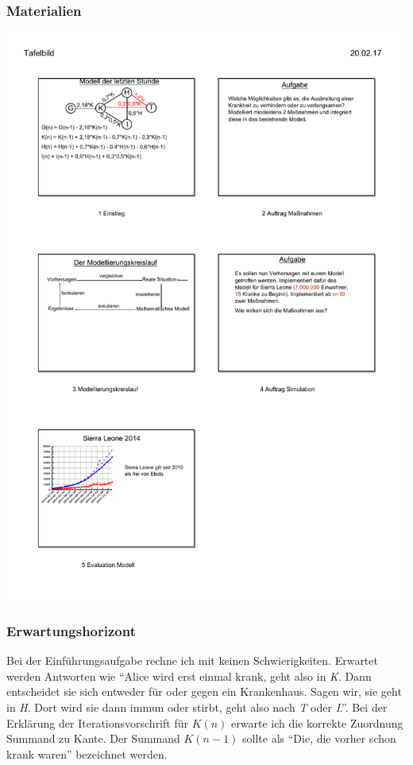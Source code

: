 \subsubsection*{Materialien}
\includegraphics[width=\textwidth]{projekt/Tafelbild_3_c}
\subsubsection*{Erwartungshorizont}
Bei der Einführungsaufgabe rechne ich mit keinen Schwierigkeiten. Erwartet werden Antworten wie ``Alice wird erst einmal krank, geht also in \emph{K}. Dann entscheidet sie sich entweder für oder gegen ein Krankenhaus. Sagen wir, sie geht in \emph{H}. Dort wird sie dann immun oder stirbt, geht also nach \emph{T} oder \emph{I}.''. Bei der Erklärung der Iterationsvorschrift für $K(n)$ erwarte ich die korrekte Zuordnung Summand zu Kante. Der Summand $K(n-1)$ sollte als ``Die, die vorher schon krank waren'' bezeichnet werden.

